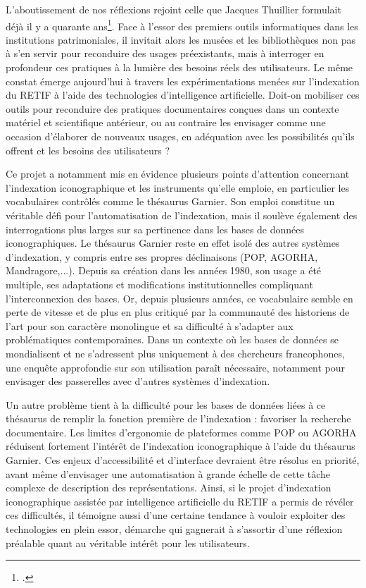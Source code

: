 L’aboutissement de nos réflexions rejoint celle que Jacques Thuillier formulait déjà il y a quarante ans\footcite{thuillierImageInformatiqueLutilisation1989}. Face à l’essor des premiers outils informatiques dans les institutions patrimoniales, il invitait alors les musées et les bibliothèques non pas à s’en servir pour reconduire des usages préexistants, mais à interroger en profondeur ces pratiques à la lumière des besoins réels des utilisateurs. Le même constat émerge aujourd’hui à travers les expérimentations menées sur l’indexation du RETIF à l’aide des technologies d’intelligence artificielle. Doit-on mobiliser ces outils pour reconduire des pratiques documentaires conçues dans un contexte matériel et scientifique antérieur, ou au contraire les envisager comme une occasion d’élaborer de nouveaux usages, en adéquation avec les possibilités qu’ils offrent et les besoins des utilisateurs ?

Ce projet a notamment mis en évidence plusieurs points d’attention concernant  l’indexation iconographique et les instruments qu’elle emploie, en particulier les vocabulaires contrôlés comme le thésaurus Garnier. Son emploi constitue un véritable défi pour l’automatisation de l’indexation, mais il soulève également des interrogations plus larges sur sa pertinence dans les bases de données iconographiques. Le thésaurus Garnier reste en effet isolé des autres systèmes d’indexation, y compris entre ses propres déclinaisons (POP, AGORHA, Mandragore,...). Depuis sa création dans les années 1980, son usage a été multiple, ses adaptations et modifications institutionnelles compliquant l’interconnexion des bases. Or, depuis plusieurs années, ce vocabulaire semble en perte de vitesse et de plus en plus critiqué par la communauté des historiens de l’art pour son caractère monolingue et sa difficulté à s’adapter aux problématiques contemporaines. Dans un contexte où les bases de données se mondialisent et ne s’adressent plus uniquement à des chercheurs francophones, une enquête approfondie sur son utilisation paraît nécessaire, notamment pour envisager des passerelles avec d’autres systèmes d’indexation.

Un autre problème tient à la difficulté pour les bases de données liées à ce thésaurus de remplir la fonction première de l’indexation : favoriser la recherche documentaire. Les limites d’ergonomie de plateformes comme POP ou AGORHA réduisent fortement l’intérêt de l’indexation iconographique à l’aide du thésaurus Garnier. Ces enjeux d’accessibilité et d’interface devraient être résolus en priorité, avant même d’envisager une automatisation à grande échelle de cette tâche complexe de description des représentations. Ainsi, si le projet d’indexation iconographique assistée par intelligence artificielle du RETIF a permis de révéler ces difficultés, il témoigne aussi d’une certaine tendance à vouloir exploiter des technologies en plein essor, démarche qui gagnerait à s’assortir d’une réflexion préalable quant au véritable intérêt pour les utilisateurs.

